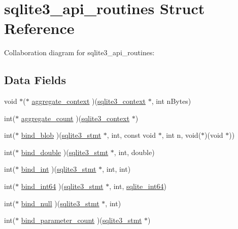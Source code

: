 \hypertarget{structsqlite3__api__routines}{}\section{sqlite3\+\_\+api\+\_\+routines Struct Reference}
\label{structsqlite3__api__routines}


Collaboration diagram for sqlite3\+\_\+api\+\_\+routines\+:
\subsection*{Data Fields}
\begin{DoxyCompactItemize}
\item 
void $\ast$($\ast$ \hyperlink{structsqlite3__api__routines_ab685b51623f261c6ad88c4db73f6157c}{aggregate\+\_\+context} )(\hyperlink{structsqlite3__context}{sqlite3\+\_\+context} $\ast$, int n\+Bytes)
\item 
int($\ast$ \hyperlink{structsqlite3__api__routines_ab3ac1965fdb669f6316ca7cec9f87877}{aggregate\+\_\+count} )(\hyperlink{structsqlite3__context}{sqlite3\+\_\+context} $\ast$)
\item 
int($\ast$ \hyperlink{structsqlite3__api__routines_a330ba6acb16254aab7a1d7f5785727d0}{bind\+\_\+blob} )(\hyperlink{sqlite3_8c_af2a033da1327cdd77f0a174a09aedd0c}{sqlite3\+\_\+stmt} $\ast$, int, const void $\ast$, int n, void($\ast$)(void $\ast$))
\item 
int($\ast$ \hyperlink{structsqlite3__api__routines_ab4d39a409179d9867682778b2a5fef30}{bind\+\_\+double} )(\hyperlink{sqlite3_8c_af2a033da1327cdd77f0a174a09aedd0c}{sqlite3\+\_\+stmt} $\ast$, int, double)
\item 
int($\ast$ \hyperlink{structsqlite3__api__routines_ad202f7ba64d1fbcbe903ae656292852b}{bind\+\_\+int} )(\hyperlink{sqlite3_8c_af2a033da1327cdd77f0a174a09aedd0c}{sqlite3\+\_\+stmt} $\ast$, int, int)
\item 
int($\ast$ \hyperlink{structsqlite3__api__routines_aedceaa5c8cf3964a314cfa9e27169ae9}{bind\+\_\+int64} )(\hyperlink{sqlite3_8c_af2a033da1327cdd77f0a174a09aedd0c}{sqlite3\+\_\+stmt} $\ast$, int, \hyperlink{sqlite3_8c_a520a95f9080c018b2fade39885bd2e2a}{sqlite\+\_\+int64})
\item 
int($\ast$ \hyperlink{structsqlite3__api__routines_a2dd582c7cf3a0bb65c1f8da45700bbac}{bind\+\_\+null} )(\hyperlink{sqlite3_8c_af2a033da1327cdd77f0a174a09aedd0c}{sqlite3\+\_\+stmt} $\ast$, int)
\item 
int($\ast$ \hyperlink{structsqlite3__api__routines_a7441ab05f379ac808cfad8d6005eed61}{bind\+\_\+parameter\+\_\+count} )(\hyperlink{sqlite3_8c_af2a033da1327cdd77f0a174a09aedd0c}{sqlite3\+\_\+stmt} $\ast$)

\end{DoxyCompactItemize}
